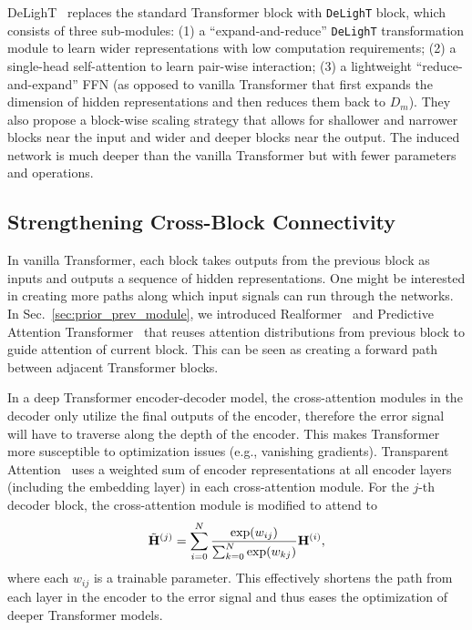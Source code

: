 \documentclass[manuscript,acmsmall,screen,nonacm]{acmart}
\theoremstyle{definition}
\begin{document}
DeLighT~\cite{mehta2020delight} replaces the standard Transformer block with \texttt{DeLighT} block, which consists of three sub-modules: (1) a ``expand-and-reduce'' \texttt{DeLighT} transformation module to learn wider representations with low computation requirements; (2) a single-head self-attention to learn pair-wise interaction; (3) a lightweight ``reduce-and-expand'' FFN (as opposed to vanilla Transformer that first expands the dimension of hidden representations and then reduces them back to $D_m$). They also propose a block-wise scaling strategy that allows for shallower and narrower blocks near the input and wider and deeper blocks near the output. The induced network is much deeper than the vanilla Transformer but with fewer parameters and operations.


\subsection{Strengthening Cross-Block Connectivity}
In vanilla Transformer, each block takes outputs from the previous block as inputs and outputs a sequence of hidden representations. One might be interested in creating more paths along which input signals can run through the networks. In Sec.~\ref{sec:prior_prev_module}, we introduced Realformer~\cite{he2020realformer} and Predictive Attention Transformer~\cite{wang2021predictive} that reuses attention distributions from previous block to guide attention of current block. This can be seen as creating a forward path between adjacent Transformer blocks.

In a deep Transformer encoder-decoder model, the cross-attention modules in the decoder only utilize the final outputs of the encoder, therefore the error signal will have to traverse along the depth of the encoder.  This makes Transformer more susceptible to optimization issues (e.g., vanishing gradients). Transparent Attention~\cite{Chen18transparentxformer} uses a weighted sum of encoder representations at all encoder layers (including the embedding layer) in each cross-attention module. For the $j$-th decoder block, the cross-attention module is modified to attend to
\begin{equation}\label{eq:transparent}
    \tilde{\mathbf{H}}^{(j)}=\sum_{i=0}^{N}\frac{\exp(w_{ij})}{\sum_{k=0}^N \exp(w_{kj})}\mathbf{H}^{(i)},
\end{equation}
where each $w_{ij}$ is a trainable parameter. This effectively shortens the path from each layer in the encoder to the error signal and thus eases the optimization of deeper Transformer models.
\end{document}
